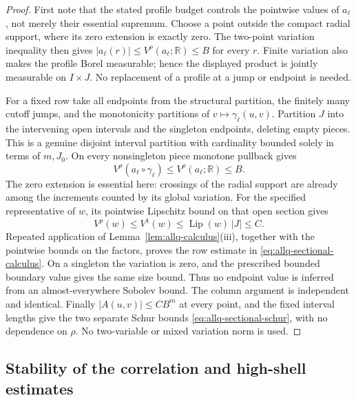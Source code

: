\documentclass[11pt]{article}
\numberwithin{equation}{section}
\theoremstyle{remark}
\theoremstyle{definition}
\begin{document}
\begin{proof}
First note that the stated profile budget controls the pointwise values of
$a_\ell$, not merely their essential supremum.  Choose a point outside
the compact radial support, where its zero extension is exactly zero.
The two-point variation inequality then gives
$|a_\ell(r)|\le V^\rho(a_\ell;\mathbb R)\le B$ for every $r$.
Finite variation also makes the profile Borel measurable; hence
the displayed product is jointly measurable on $I\times J$.
No replacement of a profile at a jump or endpoint is needed.

For a fixed row take all endpoints from the structural partition,
the finitely many cutoff jumps, and the monotonicity partitions of
$v\mapsto\gamma_\ell(u,v)$.  Partition $J$ into the intervening open
intervals and the singleton endpoints, deleting empty pieces.  This is
a genuine disjoint interval partition with cardinality bounded solely
in terms of $m,J_0$.  On every nonsingleton piece monotone pullback gives
\[
 V^\rho(a_\ell\circ\gamma_\ell)
 \le V^\rho(a_\ell;\mathbb R)\le B.
\]
The zero extension is essential here: crossings of the radial support
are already among the increments counted by its global variation.
For the specified representative of $w$, its pointwise Lipschitz bound on
that open section gives
\[
 V^\rho(w)\le V^1(w)
 \le \operatorname{Lip}(w)\,|J|\le C.
\]
Repeated application of Lemma~\ref{lem:allq-calculus}(iii), together
with the pointwise bounds on the factors, proves the row estimate in
\eqref{eq:allq-sectional-calculus}.  On a singleton the variation is
zero, and the prescribed bounded boundary value gives the same size
bound.  Thus no endpoint value is inferred from an almost-everywhere
Sobolev bound.  The column argument is independent and identical.
Finally $|A(u,v)|\le C B^m$ at every point, and the fixed interval
lengths give the two separate Schur bounds
\eqref{eq:allq-sectional-schur}, with no dependence on $\rho$.
No two-variable or mixed variation norm is used.
\end{proof}

\subsection{Stability of the correlation and high-shell estimates}
\end{document}
